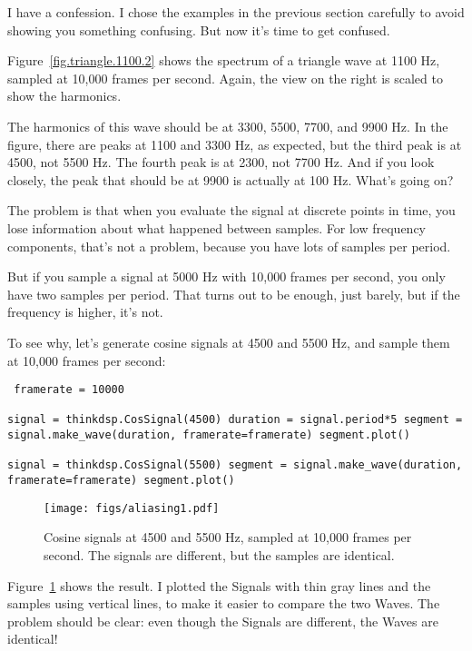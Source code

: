 \documentclass[12pt]{book} \usepackage[width=5.5in,height=8.5in, hmarginratio=3:2,vmarginratio=1:1]{geometry}
\begin{document}
I have a confession. I chose the examples in the previous section carefully to avoid showing you something confusing. But now it's time to get confused. 

Figure~\ref{fig.triangle.1100.2} shows the spectrum of a triangle wave at 1100 Hz, sampled at 10,000 frames per second. Again, the view on the right is scaled to show the harmonics. 

The harmonics of this wave should be at 3300, 5500, 7700, and 9900 Hz. In the figure, there are peaks at 1100 and 3300 Hz, as expected, but the third peak is at 4500, not 5500 Hz. The fourth peak is at 2300, not 7700 Hz. And if you look closely, the peak that should be at 9900 is actually at 100 Hz. What's going on? 

The problem is that when you evaluate the signal at discrete points in time, you lose information about what happened between samples. For low frequency components, that's not a problem, because you have lots of samples per period. 

But if you sample a signal at 5000 Hz with 10,000 frames per second, you only have two samples per period. That turns out to be enough, just barely, but if the frequency is higher, it's not. 

To see why, let's generate cosine signals at 4500 and 5500 Hz, and sample them at 10,000 frames per second: 

\begin{verbatim} framerate = 10000 

signal = thinkdsp.CosSignal(4500) duration = signal.period*5 segment = signal.make_wave(duration, framerate=framerate) segment.plot() 

signal = thinkdsp.CosSignal(5500) segment = signal.make_wave(duration, framerate=framerate) segment.plot() \end{verbatim} 

\begin{figure} 

\centerline{\texttt{[image: figs/aliasing1.pdf]}} \caption{Cosine signals at 4500 and 5500 Hz, sampled at 10,000 frames per second. The signals are different, but the samples are identical.} \label{fig.aliasing1} \end{figure} 

Figure~\ref{fig.aliasing1} shows the result. I plotted the Signals with thin gray lines and the samples using vertical lines, to make it easier to compare the two Waves. The problem should be clear: even though the Signals are different, the Waves are identical! 
\end{document}
